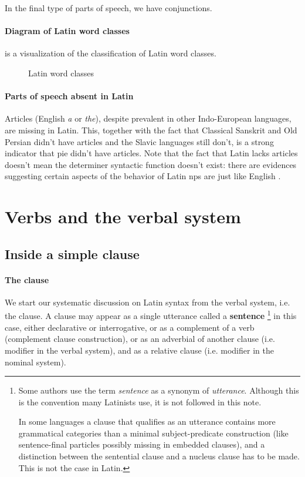 \documentclass[a4paper, oneside, 12pt]{report}
\newcommand*{\concept}[1]{\textbf{#1}}
\newcommand*{\term}[1]{\emph{#1}}
\newcommand{\form}[1]{\emph{#1}}
\begin{document}
In the final type of parts of speech, 
we have conjunctions. 

\paragraph*{Diagram of Latin word classes} 
 is a visualization of the classification of Latin word classes.

\begin{sidewaysfigure}
    \centering
    \small
    
    \caption{Latin word classes}
    \label{fig:latin-word-class}
\end{sidewaysfigure}

\paragraph*{Parts of speech absent in Latin} 
Articles (English \form{a} or \form{the}), 
despite prevalent in other Indo-European languages,
are missing in Latin.
This, together with the fact that Classical Sanskrit and Old Persian didn't have articles 
and the Slavic languages still don't,
is a strong indicator that \ac{pie} didn't have articles. 
Note that the fact that Latin lacks articles 
doesn't mean the determiner syntactic function doesn't exist:
there are evidences suggesting certain aspects of the behavior of Latin \acs{np}s 
are just like English \citep{giusti2014split}.

\section{Verbs and the verbal system}

\subsection{Inside a simple clause}

\paragraph*{The clause} We start our systematic discussion on Latin syntax from the verbal system, i.e. the clause. 
A clause may appear as a single utterance called a \concept{sentence}%
\footnote{
    Some authors use the term \term{sentence}
    as a synonym of \term{utterance}.
    Although this is the convention many Latinists use, 
    it is not followed in this note.

    In some languages a clause that qualifies as an utterance 
    contains more grammatical categories than 
    a minimal subject-predicate construction 
    (like sentence-final particles possibly missing in embedded clauses),
    and a distinction between the sentential clause and a nucleus clause 
    has to be made.
    This is not the case in Latin.
}
in this case,
either declarative or interrogative,
or as a complement of a verb (complement clause construction),
or as an adverbial of another clause
(i.e. modifier in the verbal system),
and as a relative clause 
(i.e. modifier in the nominal system).
\end{document}
